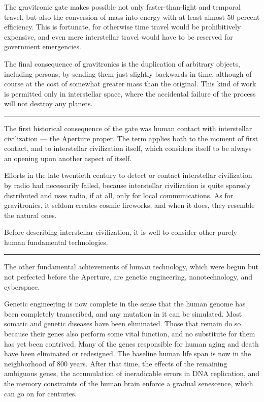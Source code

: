\documentclass[english,11pt,letterpaper,onecolumn]{scrbook}
\begin{document}
	The gravitronic gate makes possible not only faster-than-light and temporal travel, but also the conversion of mass into energy with at least almost 50 percent efficiency.  This is fortunate, for otherwise time travel would be prohibitively expensive, and even mere interstellar travel would have to be reserved for government emergencies.

	The final consequence of gravitronics is the duplication of arbitrary objects, including persons, by sending them just slightly backwards in time, although of course at the cost of somewhat greater mass than the original.  This kind of work is permitted only in interstellar space, where the accidental failure of the process will not destroy any planets.

\begin{center}\rule[3pt]{2in}{0.5pt}\end{center}

	The first historical consequence of the gate was human contact with interstellar civilization --- the Aperture proper.  The term applies both to the moment of first contact, and to interstellar civilization itself, which considers itself to be always an opening upon another aspect of itself.  

	Efforts in the late twentieth century to detect or contact interstellar civilization by radio had necessarily failed, because interstellar civilization is quite sparsely distributed and uses radio, if at all, only for local communications.  As for gravitronics, it seldom creates cosmic fireworks; and when it does, they resemble the natural ones.

	Before describing interstellar civilization, it is well to consider other purely human fundamental technologies.

\begin{center}\rule[3pt]{2in}{0.5pt}\end{center}

	The other fundamental achievements of human technology, which were begun but not perfected before the Aperture, are genetic engineering, nanotechnology, and cyberspace.

	Genetic engineering is now complete in the sense that the human genome has been completely transcribed, and any mutation in it can be simulated.  Most somatic and genetic diseases have been eliminated.  Those that remain do so because their genes also perform some vital function, and no substitute for them has yet been contrived.  Many of the genes responsible for human aging and death have been eliminated or redesigned.  The baseline human life span is now in the neighborhood of 800 years.  After that time, the effects of the remaining ambiguous genes, the accumulation of ineradicable errors in DNA replication, and the memory constraints of the human brain enforce a gradual senescence, which can go on for centuries.
\end{document}
